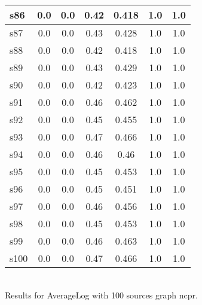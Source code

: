 \documentclass{article}
\begin{document}
\begin{tabular}{|l|c|c|c|c|c|c|}
\hline
s86 &0.0 & 0.0 & 0.42 & 0.418 & 1.0 & 1.0\\
\hline
s87 &0.0 & 0.0 & 0.43 & 0.428 & 1.0 & 1.0\\
\hline
s88 &0.0 & 0.0 & 0.42 & 0.418 & 1.0 & 1.0\\
\hline
s89 &0.0 & 0.0 & 0.43 & 0.429 & 1.0 & 1.0\\
\hline
s90 &0.0 & 0.0 & 0.42 & 0.423 & 1.0 & 1.0\\
\hline
s91 &0.0 & 0.0 & 0.46 & 0.462 & 1.0 & 1.0\\
\hline
s92 &0.0 & 0.0 & 0.45 & 0.455 & 1.0 & 1.0\\
\hline
s93 &0.0 & 0.0 & 0.47 & 0.466 & 1.0 & 1.0\\
\hline
s94 &0.0 & 0.0 & 0.46 & 0.46 & 1.0 & 1.0\\
\hline
s95 &0.0 & 0.0 & 0.45 & 0.453 & 1.0 & 1.0\\
\hline
s96 &0.0 & 0.0 & 0.45 & 0.451 & 1.0 & 1.0\\
\hline
s97 &0.0 & 0.0 & 0.46 & 0.456 & 1.0 & 1.0\\
\hline
s98 &0.0 & 0.0 & 0.45 & 0.453 & 1.0 & 1.0\\
\hline
s99 &0.0 & 0.0 & 0.46 & 0.463 & 1.0 & 1.0\\
\hline
s100 &0.0 & 0.0 & 0.47 & 0.466 & 1.0 & 1.0\\
\hline
\end{tabular}\\

\noindent Results for AverageLog with 100 sources graph ncpr.
\end{document}
